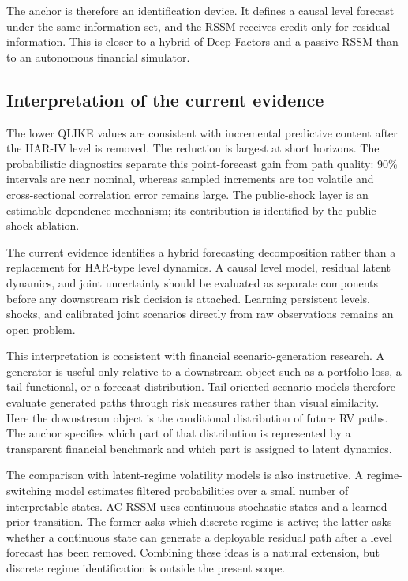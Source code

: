 \documentclass[11pt]{article}
\begin{document}
The anchor is therefore an identification device. It defines a causal level forecast under the same information set, and the RSSM receives credit only for residual information. This is closer to a hybrid of Deep Factors and a passive RSSM than to an autonomous financial simulator.

\subsection{Interpretation of the current evidence}
The lower QLIKE values are consistent with incremental predictive content after the HAR-IV level is removed. The reduction is largest at short horizons. The probabilistic diagnostics separate this point-forecast gain from path quality: 90\% intervals are near nominal, whereas sampled increments are too volatile and cross-sectional correlation error remains large. The public-shock layer is an estimable dependence mechanism; its contribution is identified by the public-shock ablation.

The current evidence identifies a hybrid forecasting decomposition rather than a replacement for HAR-type level dynamics. A causal level model, residual latent dynamics, and joint uncertainty should be evaluated as separate components before any downstream risk decision is attached. Learning persistent levels, shocks, and calibrated joint scenarios directly from raw observations remains an open problem.

This interpretation is consistent with financial scenario-generation research. A generator is useful only relative to a downstream object such as a portfolio loss, a tail functional, or a forecast distribution. Tail-oriented scenario models therefore evaluate generated paths through risk measures rather than visual similarity. Here the downstream object is the conditional distribution of future RV paths. The anchor specifies which part of that distribution is represented by a transparent financial benchmark and which part is assigned to latent dynamics.

The comparison with latent-regime volatility models is also instructive. A regime-switching model estimates filtered probabilities over a small number of interpretable states. AC-RSSM uses continuous stochastic states and a learned prior transition. The former asks which discrete regime is active; the latter asks whether a continuous state can generate a deployable residual path after a level forecast has been removed. Combining these ideas is a natural extension, but discrete regime identification is outside the present scope.
\end{document}
